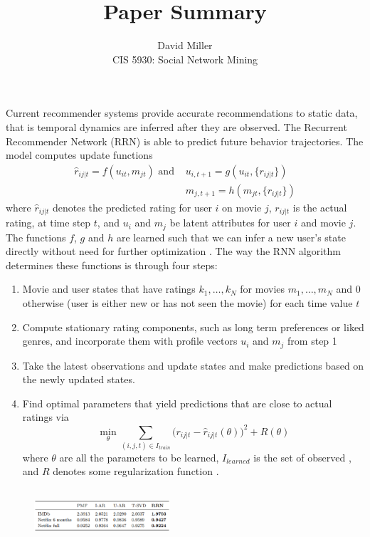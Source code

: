 \documentclass[12pt]{article}
\theoremstyle{remark}
\begin{document}
	
	\title{Paper Summary}
	\author{David Miller \\ 
		CIS 5930: Social Network Mining} 
	
	\maketitle 
	
	Current recommender systems provide accurate recommendations to static data, that is temporal dynamics are inferred after they are observed. The Recurrent Recommender Network (RRN) is able to predict future behavior trajectories. The model computes update functions
	\begin{align*}
		\hat{r}_{ij | t} = f(u_{it}, m_{jt}) \text{ and } & u_{i,t+1} = g(u_{it}, \{r_{ij | t}\}) \\
		& m_{j,t+1} = h(m_{jt},\{r_{ij | t}\})
	\end{align*}
	where $\hat{r}_{ij|t}$ denotes the predicted rating for user $i$ on movie $j$, $r_{ij|t}$ is the actual rating, at time step $t$, and $u_i$ and $m_j$ be latent attributes for user $i$ and movie $j$. The functions $f$, $g$ and $h$ are learned such that we can infer a new user’s state directly without need for further optimization \cite{paper}. The way the RNN algorithm determines these functions is through four steps:
	\begin{enumerate}
		 \item Movie and user states that have ratings $k_1, \dots, k_N$ for movies $m_1, \dots, m_N$ and 0 otherwise (user is either new or has not seen the movie) for each time value $t$  
		 \item Compute stationary rating components, such as long term preferences or liked genres, and incorporate them with profile vectors $u_i$ and $m_j$ from step 1
		 \item Take the latest observations and update states and make predictions based on the newly updated states. 
		 \item Find optimal parameters that yield predictions that are close to actual ratings via
		 $$ \min\limits_{\theta} \sum\limits_{(i,j,t) \in I_{train}} \big( r_{ij|t} - \hat{r}_{ij|t}(\theta) \big)^2 + R(\theta) $$
		 where $\theta$ are all the parameters to be learned, $I_{learned}$ is the set of observed , and $R$ denotes some regularization function \cite{paper}.
	\end{enumerate}
	
	\begin{figure}
		\vspace{-15pt}
		\hspace{-1pt}
		\includegraphics[height=2cm,width=0.45\textwidth]{fig3.eps}
	\end{figure}
	
\end{document}
